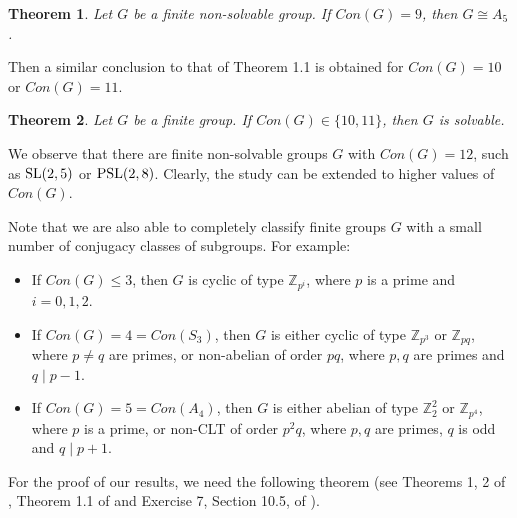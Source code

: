 \documentclass[12pt]{article}
\newtheorem{theorem}{Theorem}[section]
\newcommand{\0}{{\leqno}}
\begin{document}
\begin{theorem}
Let $G$ be a finite non-solvable group. If $Con(G)=9$, then $G\cong A_5$.
\end{theorem}

Then a similar conclusion to that of Theorem 1.1 is obtained for $Con(G)=10$ or $Con(G)=11$.

\begin{theorem}
Let $G$ be a finite group. If $Con(G)\in\{10, 11\}$, then $G$ is solvable.
\end{theorem}

We observe that there are finite non-solvable groups $G$ with $Con(G)=12$, such as ${\rm SL}(2,5)$ or ${\rm PSL}(2,8)$. Clearly, the study can be extended to higher values of $Con(G)$.

Note that we are also able to completely classify finite groups $G$ with a small number of conjugacy classes of subgroups. For example:

\begin{itemize}
\item[-] If $Con(G)\leq 3$, then $G$ is cyclic of type $\mathbb{Z}_{p^i}$, where $p$ is a prime and $i=0,1,2$. 
\item[-] If $Con(G)=4=Con(S_3)$, then $G$ is either cyclic of type $\mathbb{Z}_{p^3}$ or $\mathbb{Z}_{pq}$, where $p\neq q$ are primes, or non-abelian of order $pq$, where $p,q$ are primes and $q\mid p-1$.
\item[-] If $Con(G)=5=Con(A_4)$, then $G$ is either abelian of type $\mathbb{Z}_2^2$ or $\mathbb{Z}_{p^4}$, where $p$ is a prime, or non-CLT of order $p^2q$, where $p,q$ are primes, $q$ is odd and $q\mid p+1$.
\end{itemize}

For the proof of our results, we need the following theorem (see Theorems 1, 2 of \cite{2}, Theorem 1.1 of \cite{3} and Exercise 7, Section 10.5, of \cite{16}).
\end{document}
